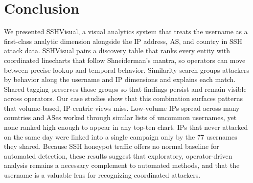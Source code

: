 \documentclass[10pt,twocolumn]{article}   %
\begin{document}
\section{Conclusion}

We presented SSHVisual, a visual analytics system that treats the username as a first-class analytic dimension alongside 
the IP address, AS, and country in SSH attack data. SSHVisual pairs a discovery table that ranks every entity with 
coordinated linecharts that follow Shneiderman’s mantra, so operators can move between precise lookup and temporal behavior. 
Similarity search groups attackers by behavior along the username and IP dimensions and explains each match. Shared tagging 
preserves those groups so that findings persist and remain visible across operators. Our case studies show that this combination 
surfaces patterns that volume-based, IP-centric views miss. Low-volume IPs spread across many countries and ASes worked through 
similar lists of uncommon usernames, yet none ranked high enough to appear in any top-ten chart. IPs that never attacked on the 
same day were linked into a single campaign only by the 77 usernames they shared. Because SSH honeypot traffic offers no normal 
baseline for automated detection, these results suggest that exploratory, operator-driven analysis remains a necessary complement 
to automated methods, and that the username is a valuable lens for recognizing coordinated attackers.

\FloatBarrier %




\end{document}

